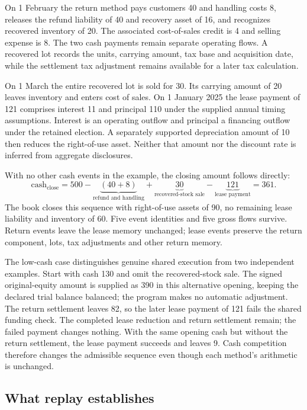 On 1 February the return method pays customers 40 and handling costs 8,
releases the refund liability of 40 and recovery asset of 16, and recognizes
recovered inventory of 20. The associated cost-of-sales credit is 4 and selling
expense is 8. The two cash payments remain separate operating flows. A recovered
lot records the units, carrying amount, tax base and acquisition date, while
the settlement tax adjustment remains available for a later tax calculation.

On 1 March the entire recovered lot is sold for 30. Its carrying amount of 20
leaves inventory and enters cost of sales. On 1 January 2025 the lease payment
of 121 comprises interest 11 and principal 110 under the supplied annual
timing assumptions. Interest is an operating outflow and principal a financing
outflow under the retained election. A separately supported depreciation
amount of 10 then reduces the right-of-use asset. Neither that amount nor the
discount rate is inferred from aggregate disclosures.

With no other cash events in the example, the closing amount follows directly:
\[
 \mathrm{cash}_{\mathrm{close}}
 =500-\underbrace{(40+8)}_{\text{refund and handling}}
       +\underbrace{30}_{\text{recovered-stock sale}}
       -\underbrace{121}_{\text{lease payment}}
 =361.
\]
The book closes this sequence with right-of-use assets of 90, no remaining
lease liability and inventory of 60. Five event identities and five gross
flows survive. Return events leave the lease memory unchanged; lease events
preserve the return component, lots, tax adjustments and other return memory.

The low-cash case distinguishes genuine shared execution from two independent
examples. Start with cash 130 and omit the recovered-stock sale. The signed original-equity
amount is supplied as 390 in this alternative opening, keeping the declared
trial balance balanced; the program makes no automatic adjustment. The return
settlement leaves 82, so the later lease payment of 121 fails the shared funding
check. The completed lease reduction and return settlement remain; the failed
payment changes nothing. With the same opening cash but without the return
settlement, the lease payment succeeds and leaves 9. Cash competition therefore
changes the admissible sequence even though each method's arithmetic is
unchanged.

\subsection{What replay establishes}

